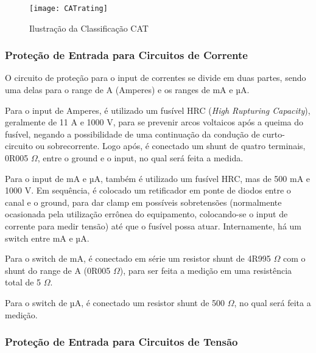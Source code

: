     \begin{figure}[htb]%
        \caption{Ilustração da Classificação CAT}%
        \label{fig:CATrating}%
        \texttt{[image: CATrating]}%
    \end{figure}


    
        \subsubsection{Proteção de Entrada para Circuitos de Corrente}\label{subsec:protecaoCorrente}

        O circuito de proteção para o input de correntes se divide em duas partes, sendo uma delas para o range de A (Amperes) e os ranges de mA e µA.

	    Para o input de Amperes, é utilizado um fusível \gls{HRC} (\textit{High Rupturing Capacity}), geralmente de 11 A e 1000 V, para se prevenir arcos voltaicos após a queima do fusível, negando a possibilidade de uma continuação da condução de curto-circuito ou sobrecorrente. Logo após, é conectado um shunt de quatro terminais, 0R005 $\Omega$, entre o ground e o input, no qual será feita a medida.

	    Para o input de mA e µA, também é utilizado um fusível \gls{HRC}, mas de 500 mA e 1000 V. Em sequência, é colocado um retificador em ponte de diodos entre o canal e o ground, para dar clamp em possíveis sobretensões (normalmente ocasionada pela utilização errônea do equipamento, colocando-se o input de corrente para medir tensão) até que o fusível possa atuar. Internamente, há um switch entre mA e µA. 

        Para o switch de mA, é conectado em série um resistor shunt de 4R995 $\Omega$ com o shunt do range de A (0R005 $\Omega$), para ser feita a medição em uma resistência total de 5 $\Omega$.

        Para o switch de µA, é conectado um resistor shunt de 500 $\Omega$, no qual será feita a medição. %

        \subsubsection{Proteção de Entrada para Circuitos de Tensão}\label{subsec:protecaoTensao}

